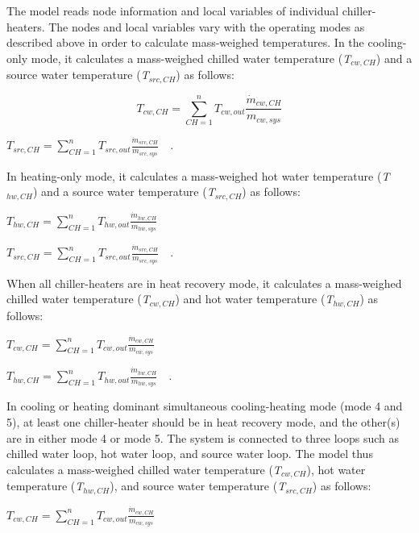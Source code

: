 The model reads node information and local variables of individual chiller-heaters. The nodes and local variables vary with the operating modes as described above in order to calculate mass-weighed temperatures. In the cooling-only mode, it calculates a mass-weighed chilled water temperature (\emph{T\(_{cw,CH}\)}) and a source water temperature (\emph{T\(_{src,CH}\)}) as follows:

\begin{equation}
{T_{cw,CH}} = \sum\limits_{CH = 1}^n {{T_{cw,out}}} \frac{{{{\dot m}_{cw,CH}}}}{{{m_{cw,sys}}}}
\end{equation}

\textbf{\emph{\({T_{src,CH}} = \sum\limits_{CH = 1}^n {{T_{src,out}}} \frac{{{{\dot m}_{src,CH}}}}{{{m_{src,sys}}}}\) ~}}.

In heating-only mode, it calculates a mass-weighed hot water temperature (\emph{T\(_{hw,CH}\)}) and a source water temperature (\emph{T\(_{src,CH}\)}) as follows:

\textbf{\emph{\({T_{hw,CH}} = \sum\limits_{CH = 1}^n {{T_{hw,out}}} \frac{{{{\dot m}_{hw,CH}}}}{{{m_{hw,sys}}}}\) ~}}

\textbf{\emph{\({T_{src,CH}} = \sum\limits_{CH = 1}^n {{T_{src,out}}} \frac{{{{\dot m}_{src,CH}}}}{{{m_{src,sys}}}}\) ~}}.

When all chiller-heaters are in heat recovery mode, it calculates a mass-weighed chilled water temperature (\emph{T\(_{cw,CH}\)}) and hot water temperature (\emph{T\(_{hw,CH}\)}) as follows:

\textbf{\emph{\({T_{cw,CH}} = \sum\limits_{CH = 1}^n {{T_{cw,out}}} \frac{{{{\dot m}_{cw,CH}}}}{{{m_{cw,sys}}}}\)}}

\textbf{\emph{\({T_{hw,CH}} = \sum\limits_{CH = 1}^n {{T_{hw,out}}} \frac{{{{\dot m}_{hw,CH}}}}{{{m_{hw,sys}}}}\) ~}}.

In cooling or heating dominant simultaneous cooling-heating mode (mode 4 and 5), at least one chiller-heater should be in heat recovery mode, and the other(s) are in either mode 4 or mode 5. The system is connected to three loops such as chilled water loop, hot water loop, and source water loop. The model thus calculates a mass-weighed chilled water temperature (\emph{T\(_{cw,CH}\)}), hot water temperature (\emph{T\(_{hw,CH}\)}), and source water temperature (\emph{T\(_{src,CH}\)}) as follows:

\textbf{\emph{\({T_{cw,CH}} = \sum\limits_{CH = 1}^n {{T_{cw,out}}} \frac{{{{\dot m}_{cw,CH}}}}{{{m_{cw,sys}}}}\)}}

